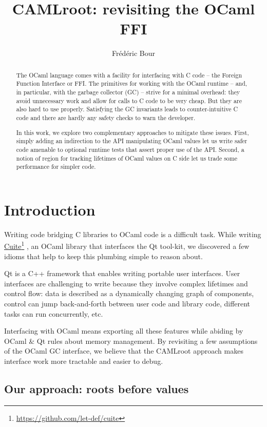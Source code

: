 \documentclass[a4paper]{easychair}
\title{CAMLroot: revisiting the OCaml FFI}
\author{
  Frédéric Bour
}
\institute{
}
\newcommand\fnurl[2]{%
\href{#2}{#1}\footnote{\url{#2}}%
}
\begin{document}
\maketitle

\begin{abstract}
The OCaml language comes with a facility for interfacing with C code -- the Foreign Function Interface or FFI. The primitives for working with the OCaml runtime -- and, in particular, with the garbage collector (GC) -- strive for a minimal overhead: they avoid unnecessary work and allow for calls to C code to be very cheap. But they are also hard to use properly. Satisfying the GC invariants leads to counter-intuitive C code and there are hardly any safety checks to warn the developer.

In this work, we explore two complementary approaches to mitigate these issues. First, simply adding an indirection to the API manipulating OCaml values let us write safer code amenable to optional runtime tests that assert proper use of the API. Second, a notion of region for tracking lifetimes of OCaml values on C side let us trade some performance for simpler code.
\end{abstract}

\section{Introduction}

Writing code bridging C libraries to OCaml code is a difficult task.
While writing \fnurl{Cuite}{https://github.com/let-def/cuite}, an OCaml
library that interfaces the Qt tool-kit, we discovered a few idioms that
help to keep this plumbing simple to reason about.

Qt is a C++ framework that enables writing portable user interfaces.
User interfaces are challenging to write because they involve complex
lifetimes and control flow: data is described as a dynamically changing
graph of components, control can jump back-and-forth between user code
and library code, different tasks can run concurrently, etc.

Interfacing with OCaml means exporting all these features while abiding
by OCaml \& Qt rules about memory management. By revisiting a few
assumptions of the OCaml GC interface, we believe that the CAMLroot 
approach makes interface work more tractable and easier to debug.

\subsection{Our approach: roots before values}
\end{document}
